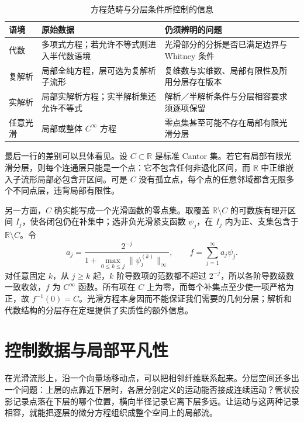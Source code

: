 \begin{table}[htbp]
	\centering
	\caption{方程范畴与分层条件所控制的信息}
	\label{g2:tab:stratification-categories}
	\begin{tabularx}{\textwidth}{@{}lXX@{}}
		\toprule
		语境 & 原始数据 & 仍须辨明的问题 \\
		\midrule
		代数 & 多项式方程；若允许不等式则进入半代数语境 & 光滑部分的分拆是否已满足边界与 Whitney 条件 \\
		复解析 & 局部全纯方程，层可选为复解析子流形 & 复维数与实维数、局部有限性及所用分层存在版本 \\
		实解析 & 局部实解析方程；实半解析集还允许不等式 & 解析／半解析条件与分层相容要求须逐项保留 \\
		任意光滑 & 局部或整体 \(C^\infty\) 方程 & 零点集甚至可能不存在局部有限光滑分层 \\
		\bottomrule
	\end{tabularx}
\end{table}

最后一行的差别可以具体看见。设 \(C\subset\mathbb R\) 是标准 Cantor 集。若它有局部有限光滑分层，则每个连通层只能是一个点：它不包含任何非退化区间，而 \(\mathbb R\) 中正维嵌入子流形局部必包含开区间。可是 \(C\) 没有孤立点，每个点的任意邻域都含无限多个不同点层，违背局部有限性。

\ProseParagraphBreak

另一方面，\(C\) 确实能写成一个光滑函数的零点集。取覆盖 \(\mathbb R\setminus C\) 的可数族有理开区间 \(I_j\)，使各闭包仍在补集中；选非负光滑紧支函数 \(\psi_j\)，在 \(I_j\) 内为正、支集包含于 \(\mathbb R\setminus C\)。令
\[
	a_j=\frac{2^{-j}}{1+\max_{0\leq k\leq j}\lVert\psi_j^{(k)}\rVert_\infty},
	\qquad f=\sum_{j=1}^{\infty}a_j\psi_j.
\]
对任意固定 \(k\)，从 \(j\geq k\) 起，\(k\) 阶导数项的范数都不超过 \(2^{-j}\)，所以各阶导数级数一致收敛，\(f\) 为 \(C^\infty\) 函数。所有项在 \(C\) 上为零，而每个补集点至少使一项严格为正，故 \(f^{-1}(0)=C\)。光滑方程本身因而不能保证我们需要的几何分层；解析和代数结构的分层存在定理提供了实质性的额外信息。

\section{控制数据与局部平凡性}
\label{g2:sec:B02}

在光滑流形上，沿一个向量场移动点，可以把相邻纤维联系起来。分层空间还多出一个问题：上层的点靠近下层时，各层分别定义的运动能否接成连续运动？管状投影记录点落在下层的哪个位置，横向半径记录它离下层多远。让运动与这两种记录相容，就能把逐层的微分方程组织成整个空间上的局部流。

